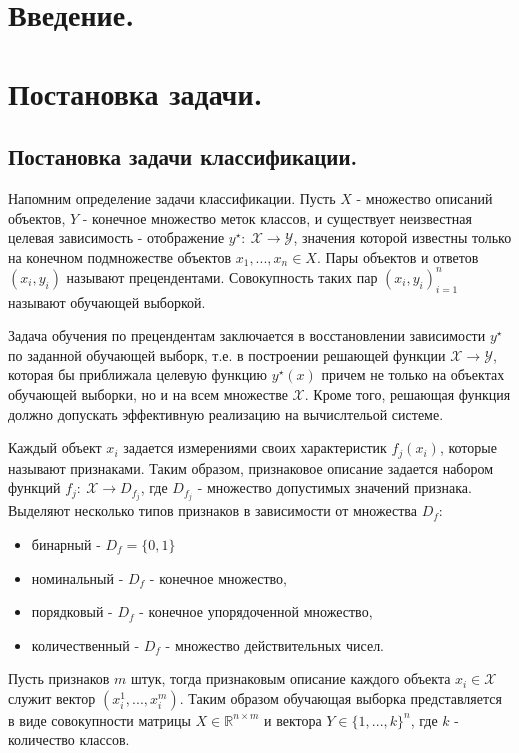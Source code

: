 \documentclass[12pt]{article}
\begin{document}
\tableofcontents
\newpage


\section{Введение.}


\section{Постановка задачи.}

\subsection{Постановка задачи классификации.}

\par
Напомним определение задачи классификации. 
Пусть $X$ - множество описаний объектов, $Y$ - конечное множество меток классов, и 
существует неизвестная целевая зависимость - отображение 
$y^\star:\ \mathcal{X} \to \mathcal{Y}$, 
значения которой известны только на конечном подмножестве объектов
$x_1, ..., x_n \in X$. Пары объектов и ответов $(x_i, y_i)$ называют прецендентами.
Совокупность таких пар ${(x_i, y_i)}_{i=1}^n$ называют обучающей выборкой.
\par
Задача обучения по прецендентам заключается в восстановлении зависимости $y^\star$
по заданной обучающей выборк, т.е. в построении решающей функции 
$\mathcal{X} \to \mathcal{Y}$, которая бы
приближала целевую функцию $y^\star(x)$ причем не только на объектах обучающей выборки,
но и на всем множестве $\mathcal{X}$. Кроме того, решающая функция должно допускать эффективную
реализацию на вычислтельой системе.
\par
Каждый объект $x_i$ задается измерениями своих характеристик $f_j(x_i)$, 
которые называют признаками. Таким образом, признаковое описание задается набором функций
$f_j:\ \mathcal{X}\to D_{f_j}$, где $D_{f_j}$ - множество допустимых значений признака.
Выделяют несколько типов признаков в зависимости от множества $D_f$:
\begin{itemize} 
\item бинарный - $D_f=\{0,1\}$
\item номинальный - $D_f$ - конечное множество,
\item порядковый - $D_f$ - конечное упорядоченной множество,
\item количественный - $D_f$ - множество действительных чисел.
\end{itemize}
Пусть признаков $m$ штук, тогда признаковым описание каждого объекта 
$x_i \in \mathcal{X}$ служит вектор $(x_i^1, ..., x_i^m)$. 
Таким образом обучающая выборка представляется в виде совокупности матрицы 
$X \in \mathbb{R}^{n \times m}$ и вектора $Y \in \{1, ..., k\}^n$, где 
$k$ - количество классов.
\end{document}
